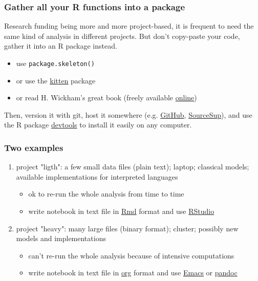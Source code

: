 \documentclass[c]{beamer} %
\begin{document}
\begin{frame}
  \frametitle{Gather all your R functions into a package}
  Research funding being more and more project-based, it is frequent to need the same kind of analysis in different projects.
  But don't copy-paste your code, gather it into an R package instead.
  
  \bigskip
  
  \begin{itemize}
  \item use \texttt{package.skeleton()}
  \item or use the \href{https://cran.r-project.org/package=pkgKitten}{kitten} package
  \item or read H. Wickham's great book (freely available \href{http://r-pkgs.had.co.nz/}{online})
  \end{itemize}
  
  \bigskip
  
  Then, version it with git, host it somewhere (e.g. \href{https://github.com/}{GitHub}, \href{https://www.renater.fr/fr/SourceSup}{SourceSup}), and use the R package \href{https://cran.r-project.org/package=devtools}{devtools} to install it easily on any computer.
\end{frame}

\begin{frame}[fragile]
  \frametitle{Two examples}
  \begin{enumerate}
  \item \alert{project "ligth"}: a few small data files (plain text); laptop; classical models; available implementations for interpreted languages
    \begin{itemize}
    \item ok to re-run the whole analysis from time to time
    \item write notebook in text file in \href{http://cran.r-project.org/web/packages/rmarkdown/index.html}{Rmd} format and use \href{http://www.rstudio.com/products/rstudio/download/}{RStudio}
    \end{itemize}
    \bigskip
    \pause
  \item \alert{project "heavy"}: many large files (binary format); cluster; possibly new models and implementations
    \begin{itemize}
    \item can't re-run the whole analysis because of intensive computations
    \item write notebook in text file in \href{http://orgmode.org/}{org} format and use \href{https://www.gnu.org/software/emacs/}{Emacs} or \href{http://johnmacfarlane.net/pandoc/}{pandoc}
    \end{itemize}
  \end{enumerate}
\end{frame}
\end{document}
